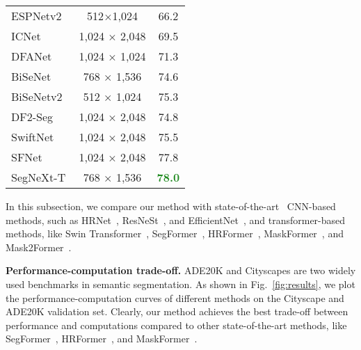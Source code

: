 \documentclass{article}
\def\sArt{state-of-the-art~}
\newcommand{\figref}[1]{Fig.~\ref{#1}}
\begin{document}
\begin{table}[t]
\begin{minipage}{0.48\textwidth}
\begin{tabular}{l|c|c}
	ESPNetv2~\cite{mehta2019espnetv2} & 512$\times$1,024 & 66.2  \\ 
    ICNet~\cite{zhao2018icnet} &  1,024 × 2,048 &  69.5  \\ 
DFANet~\cite{li2019dfanet} & 1,024 × 1,024 & 71.3  \\ 
	BiSeNet~\cite{yu2018bisenet} & 768 × 1,536 &  74.6  \\ 
	BiSeNetv2~\cite{yu2021bisenet} & 512 × 1,024 &  75.3  \\ 
	DF2-Seg~\cite{li2019partial} &  1,024 × 2,048 & 74.8  \\ 
	SwiftNet~\cite{orsic2019defense} & 1,024 × 2,048 & 75.5  \\ 
	SFNet~\cite{li2020semantic} & 1,024 × 2,048 & 77.8  \\ 
	\midrule
	SegNeXt-T & 768 × 1,536 &  \textbf{\textcolor{ForestGreen}{78.0}} \\ 
\bottomrule
\end{tabular}
\label{tab:real_time_city}
\end{minipage}
\end{table}
In this subsection, we compare our method with \sArt 
CNN-based methods, such as HRNet~\cite{wang2020deep}, ResNeSt~\cite{zhang2020resnest}, and EfficientNet~\cite{tan2019efficientnet}, and
transformer-based methods, like Swin Transformer~\cite{liu2021swin}, 
SegFormer~\cite{xie2021segformer}, HRFormer~\cite{yuan2021hrformer}, 
MaskFormer~\cite{cheng2021maskformer}, and Mask2Former~\cite{cheng2021mask2former}. 



\textbf{Performance-computation trade-off.}
ADE20K and Cityscapes are two widely used benchmarks in semantic segmentation.
As shown in \figref{fig:results}, we plot the performance-computation curves of
different methods on the Cityscape and ADE20K validation set. 
Clearly, our method achieves the best trade-off between performance and computations
compared to other state-of-the-art methods, like SegFormer~\cite{xie2021segformer}, HRFormer~\cite{yuan2021hrformer}, and MaskFormer~\cite{cheng2021maskformer}.
\end{document}

